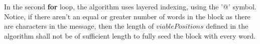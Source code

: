 \documentclass[12]{article}
\begin{document}
	In the second \textbf{for} loop, the algorithm uses layered indexing, using the '@' symbol. Notice, if there aren't an equal or greater number of words in the block as there are characters in the message, then the length of $viablePositions$ defined in the algorithm shall not be of sufficient length to fully seed the block with every word.
\end{document}
